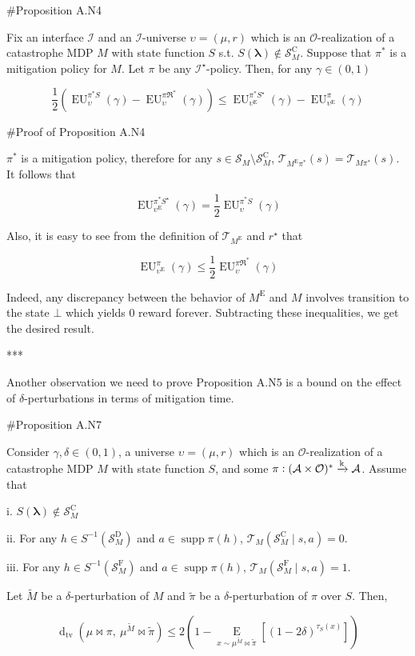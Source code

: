 \documentclass[a4paper]{article}
\DeclareMathOperator{\Supp}{supp}
\newcommand{\AP}[1]{\left(#1\right)}
\newcommand{\AB}[1]{\left[#1\right]}
\newcommand{\Ea}[2]{\underset{#1}{\operatorname{E}}\AB{#2}}
\newcommand{\Dtva}[1]{\operatorname{d}_{\text{tv}}\AP{#1}}
\newcommand{\Estr}{\boldsymbol{\lambda}}
\newcommand{\M}{\xrightarrow{\textnormal{k}}}
\newcommand{\Ob}{\mathcal{O}}
\newcommand{\A}{\mathcal{A}}
\newcommand{\St}{\mathcal{S}}
\newcommand{\T}{\mathcal{T}}
\newcommand{\In}{\mathcal{I}}
\newcommand{\FH}{(\A \times \Ob)^*}
\newcommand{\RMC}{\mathrm{C}}
\newcommand{\RMD}{\mathrm{D}}
\newcommand{\RME}{\mathrm{E}}
\newcommand{\RMF}{\mathrm{F}}
\newcommand{\SF}{\St^{\RMF}}
\newcommand{\SD}{\St^{\RMD}}
\newcommand{\SC}{\St^{\RMC}}
\newcommand{\ME}{M^{\RME}}
\newcommand{\EU}{\operatorname{EU}}
\begin{document}
\#Proposition A.N4

Fix an interface $\In$ and an $\In$-universe $\upsilon=(\mu,r)$ which is an $\Ob$-realization of a catastrophe MDP $M$ with state function $S$ s.t. $S(\Estr)\not\in\SC_M$. Suppose that $\pi^*$ is a mitigation policy for $M$. Let $\pi$ be any $\In^\star$-policy. Then, for any $\gamma\in(0,1)$

$$\frac{1}{2}\AP{\EU_{\upsilon}^{\pi^* S}(\gamma)-\EU_{\upsilon}^{\pi\Re^*}(\gamma)} \leq \EU_{\upsilon^\RME}^{\pi^* S^\star}(\gamma)-\EU_{\upsilon^\RME}^{\pi}(\gamma)$$

\#Proof of Proposition A.N4

$\pi^*$ is a mitigation policy, therefore for any $s \in \St_M \setminus \SC_M$, $\T_{\ME\pi^*}(s)=\T_{M\pi^*}(s)$. It follows that 

$$\EU_{\upsilon^\RME}^{\pi^* S^\star}(\gamma) = \frac{1}{2}\EU_{\upsilon}^{\pi^* S}(\gamma)$$

Also, it is easy to see from the definition of $\T_{\ME}$ and $r^\star$ that

$$\EU_{\upsilon^\RME}^{\pi}(\gamma) \leq \frac{1}{2}\EU_{\upsilon}^{\pi\Re^*}(\gamma)$$

Indeed, any discrepancy between the behavior of $\ME$ and $M$ involves transition to the state $\bot$ which yields 0 reward forever. Subtracting these inequalities, we get the desired result.

***

Another observation we need to prove Proposition A.N5 is a bound on the effect of $\delta$-perturbations in terms of mitigation time.

\#Proposition A.N7

Consider $\gamma,\delta\in(0,1)$, a universe $\upsilon=(\mu,r)$ which is an $\Ob$-realization of a catastrophe MDP $M$ with state function $S$, and some $\pi: \FH \M \A$. Assume that 

i. $S(\Estr) \not\in \SC_M$

ii. For any $h \in S^{-1}\AP{\SD_M}$ and $a \in \Supp{\pi(h)}$, $\T_M\AP{\SC_M \mid s,a} = 0$.

iii. For any $h \in S^{-1}\AP{\SF_M}$ and $a \in \Supp{\pi(h)}$, $\T_M\AP{\SF_M \mid s,a} = 1$. 

Let $\tilde{M}$ be a $\delta$-perturbation of $M$ and $\tilde{\pi}$ be a $\delta$-perturbation of $\pi$ over $S$. Then,

$$\Dtva{\mu\bowtie\pi,\ \mu^{\tilde{M}}\bowtie\tilde{\pi}} \leq 2\AP{1-\Ea{x\sim\mu^{\tilde{M}}\bowtie\tilde{\pi}}{\AP{1-2\delta}^{\tau_S(x)}}}$$
\end{document}
